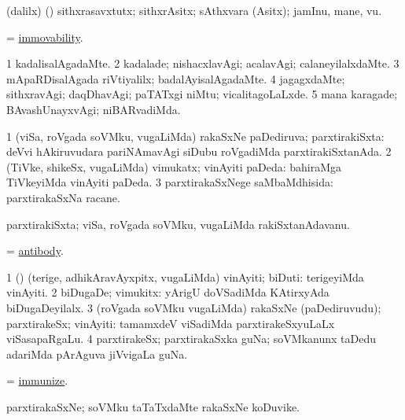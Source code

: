 \bentry
{}
\gl{\nA}
\bmng
(\bava dalilx) (\nAyxshA) sithxrasavxtutx; sithxrAsitx; sAthxvara (Asitx); jamInu, mane, \mo vu. 
\emng
\eentry

\bentry
{}
\gl{\nA}
\bmng
 = \hyperlink{immovability}{immovability}. 
\emng
\eentry

\bentry
{}
\gl{\kirxvi}
\bmng
\bnum
\num{1} kadalisalAgadaMte. 
\num{2} kadalade; nishacxlavAgi; acalavAgi; calaneyilalxdaMte. 
\num{3} mApaRDisalAgada riVtiyalilx; badalAyisalAgadaMte. 
\num{4} jagagxdaMte; sithxravAgi; daqDhavAgi; paTATxgi niMtu; vicalitagoLaLxde. 
\num{5} mana karagade; BAvashUnayxvAgi; niBARvadiMda. 
\enum
\emng
\eentry

\bentry
{}
\gl{\gu}
\bmng
\bnum
\num{1} (viSa, roVgada soVMku, \mo vugaLiMda) rakaSxNe paDediruva; parxtirakiSxta:  deVvi hAkiruvudara pariNAmavAgi siDubu roVgadiMda parxtirakiSxtanAda. 
\num{2} (TiVke, shikeSx, \mo vugaLiMda) vimukatx; vinAyiti paDeda:  bahiraMga TiVkeyiMda vinAyiti paDeda. 
\num{3} parxtirakaSxNege saMbaMdhisida:  parxtirakaSxNa racane. 
\enum
\emng
\eentry

\bentry
{}
\gl{\nA}
\bmng
parxtirakiSxta; viSa, roVgada soVMku, \mo vugaLiMda rakiSxtanAdavanu. 
\emng
\eentry

\bentry
{}
\gl{\nA}
\bmng
= \hyperref{kandict_a.pdf}{A}{antibody}{antibody}. 
\emng
\eentry

\bentry
{}
\gl{\nA}
\bmng
\bnum
\num{1} (\nAyxshA) (terige, adhikAravAyxpitx, \mo vugaLiMda) vinAyiti; biDuti:  terigeyiMda vinAyiti. 
\num{2} biDugaDe; vimukitx:  yArigU doVSadiMda KAtirxyAda biDugaDeyilalx. 
\num{3} (roVgada soVMku \mo vugaLiMda) rakaSxNe (paDediruvudu); parxtirakeSx; vinAyiti:  tamamxdeV viSadiMda parxtirakeSxyuLaLx viSasapaRgaLu. 
\num{4} parxtirakeSx; parxtirakaSxka guNa; soVMkanunx taDedu adariMda pArAguva jiVvigaLa guNa. 
\enum
\emng
\eentry

\bentry
{}
\gl{\sakirx}
\bmng
 = \hyperlink{immunize}{immunize}. 
\emng
\eentry

\bentry
{}
\gl{\nA}
\bmng
parxtirakaSxNe; soVMku taTaTxdaMte rakaSxNe koDuvike. 
\emng
\eentry

